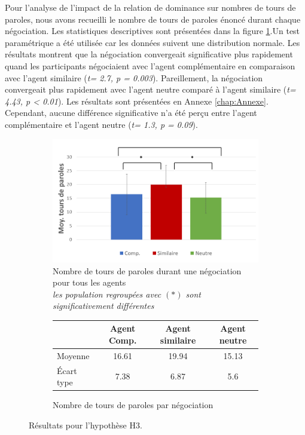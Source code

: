 			Pour l'analyse de l'impact de la relation de dominance sur nombres de tours de paroles, nous avons recueilli le nombre de tours de paroles énoncé durant chaque négociation. Les statistiques descriptives sont présentées dans la figure \ref{fig:tour}.Un test paramétrique a été utilisée car les données suivent une distribution normale. Les résultats montrent que la négociation convergeait significative plus rapidement quand les participants négociaient avec l'agent complémentaire en comparaison avec l'agent similaire (\emph{t= 2.7, p = 0.003}). Pareillement, la négociation convergeait plus rapidement avec l'agent neutre comparé à l'agent similaire (\emph{t= 4.43, p < 0.01}).  Les résultats sont présentées en Annexe \ref{chap:Annexe}.
			Cependant, aucune différence significative n'a été perçu entre l'agent complémentaire et l'agent neutre (\emph{t= 1.3, p = 0.09}).  
			
		\begin{figure}[h]
			
			\begin{subfigure}[h]{0.8\textwidth}
				\centering
				\includegraphics[clip=false]{Figures/chap7/tours.PNG}
				\caption{Nombre de tours de paroles durant une négociation pour tous les agents \\ \textit{les population regroupées avec $(*)$ sont significativement différentes }}
			\end{subfigure}
		
			\begin{subfigure}[h]{0.8\textwidth}
				\centering
				\begin{tabular}{ l c c c }
					\hline
					\textbf{ }& \textbf{Agent Comp.} & \textbf{Agent similaire} & \textbf{Agent neutre} \\ 
					\hline
					\newline Moyenne & 16.61& 19.94 & 15.13 \\
					\newline Écart type & 7.38 & 6.87 & 5.6 \\
					\hline
					
				\end{tabular}
				\caption{Nombre de tours de paroles par négociation} 
			\end{subfigure}
			\caption{Résultats pour l'hypothèse H3.}
			\label{fig:tour}
	\end{figure}


